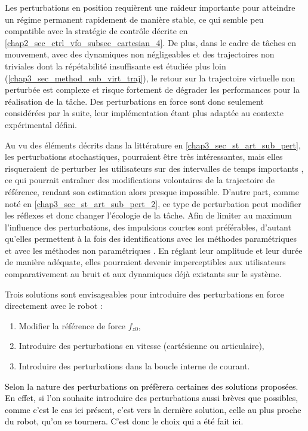 Les perturbations en position requièrent une raideur importante pour atteindre un régime permanent rapidement de manière stable, ce qui semble peu compatible avec la stratégie de contrôle décrite en \cref{chap2_sec_ctrl_vfo_subsec_cartesian_4}. De plus, dans le cadre de tâches en mouvement, avec des dynamiques non négligeables et des trajectoires non triviales dont la répétabilité insuffisante est étudiée plus loin (\cref{chap3_sec_method_sub_virt_traj}), le retour sur la trajectoire virtuelle non perturbée est complexe et risque fortement de dégrader les performances pour la réalisation de la tâche. Des perturbations en force sont donc seulement considérées par la suite, leur implémentation étant plus adaptée au contexte expérimental défini.

Au vu des éléments décrits dans la littérature en \cref{chap3_sec_st_art_sub_pert}, les perturbations stochastiques, pourraient être très intéressantes, mais elles risqueraient de perturber les utilisateurs sur des intervalles de temps importants \parencite{piovesan_measuring_2012}, ce qui pourrait entraîner des modifications volontaires de la trajectoire de référence, rendant son estimation alors presque impossible. D'autre part, comme noté en \cref{chap3_sec_st_art_sub_pert_2}, ce type de perturbation peut modifier les réflexes \parencite{agarwal_effect_1980,stein_nonlinear_1995} et donc changer l'écologie de la tâche. Afin de limiter au maximum l'influence des perturbations, des impulsions courtes sont préférables, d'autant qu'elles permettent à la fois des identifications avec les méthodes paramétriques \parencite{gomi_human_1997,erden_end-point_2015} et avec les méthodes non paramétriques \parencite{piovesan_measuring_2012}. En réglant leur amplitude et leur durée de manière adéquate, elles pourraient devenir imperceptibles aux utilisateurs comparativement au bruit et aux dynamiques déjà existants sur le système.

Trois solutions sont envisageables pour introduire des perturbations en force directement avec le robot :

\begin{enumerate}
	\item Modifier la référence de force $ f_{z0} $,
	\item Introduire des perturbations en vitesse (cartésienne ou articulaire),
	\item Introduire des perturbations dans la boucle interne de courant.
\end{enumerate}

\textcolor{black}{Selon la nature des perturbations on préfèrera certaines des solutions proposées. En effet, si l'on souhaite introduire des perturbations aussi brèves que possibles, comme c'est le cas ici présent, c'est vers la dernière solution, celle au plus proche du robot, qu'on se tournera. C'est donc le choix qui a été fait ici.}

